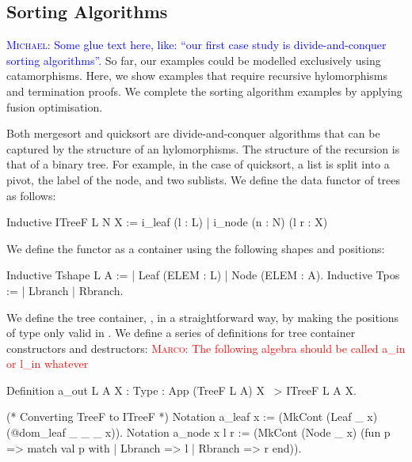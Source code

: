 \documentclass[ a4paper, UKenglish, cleveref, autoref, thm-restate]{lipics-v2021}
\newcommand{\mpav}[1]{\textcolor{red}{\textsc{Marco}: #1}}
\newcommand{\mvol}[1]{\textcolor{blue}{\textsc{Michael}: #1}}
\begin{document}
\subsection{Sorting Algorithms}
\mvol{Some glue text here, like: ``our first case study is divide-and-conquer sorting
  algorithms''.}
So far, our examples could be modelled exclusively using catamorphisms. Here, we
show examples that require recursive hylomorphisms and termination proofs.  We
complete the sorting algorithm examples by applying fusion optimisation.

Both mergesort and quicksort are divide-and-conquer algorithms that can be
captured by the structure of an hylomorphisms. The structure of the recursion
is that of a binary tree.  For example, in the case of quicksort, a list is split
into a pivot, the label of the node, and two sublists. We define the data
functor of trees as follows:
\begin{coqcode}
Inductive ITreeF L N X := i_leaf (l : L) | i_node (n : N) (l r : X)
\end{coqcode}
We define the functor as a container using the following shapes and positions:
\begin{coqcode}
Inductive Tshape L A := | Leaf (ELEM : L) | Node (ELEM : A).
Inductive Tpos := | Lbranch | Rbranch. 
\end{coqcode}
We define the tree container, , in a straightforward way, by making
the positions of type  only valid in .
We define a series of definitions for tree container constructors and 
destructors:
\mpav{The following algebra should be called a\_in or l\_in whatever}
\begin{coqcode}
Definition a_out {L A X : Type} : App (TreeF L A) X ~> ITreeF L A X.

(* Converting TreeF to ITreeF *)
Notation a_leaf x := (MkCont (Leaf _ x) (@dom_leaf _ _ _ x)).
Notation a_node x l r := (MkCont (Node _ x)
  (fun p => match val p with | Lbranch => l | Rbranch => r end)).
\end{coqcode}

\end{document}
